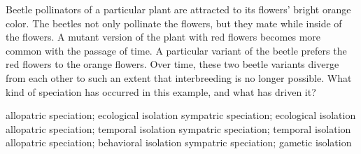 \question
Beetle pollinators of a particular plant are attracted to its flowers' bright orange color. The beetles not only pollinate the flowers, but they mate while inside of the flowers. A mutant version of the plant with red flowers becomes more common with the passage of time. A particular variant of the beetle prefers the red flowers to the orange flowers. Over time, these two beetle variants diverge from each other to such an extent that interbreeding is no longer possible. What kind of speciation has occurred in this example, and what has driven it?

\begin{choices}
\choice allopatric speciation; ecological isolation%
\correctchoice sympatric speciation; ecological isolation%
\choice allopatric speciation; temporal isolation%
\choice sympatric speciation; temporal isolation%
\choice allopatric speciation; behavioral isolation%
\choice sympatric speciation; gametic isolation%
\end{choices}


